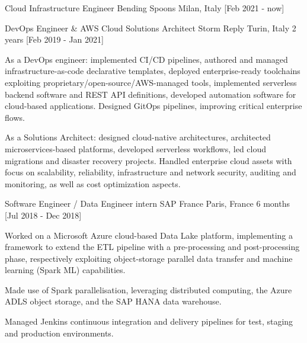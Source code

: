 

\begin{cventries}


  \cventry
    {Cloud Infrastructure Engineer} %
    {Bending Spoons} %
    {Milan, Italy} %
    {[Feb 2021 - now]} %
    {
        \begin{cvitems} %
\item 
        \end{cvitems}
    }

  \cventry
    {DevOps Engineer \& AWS Cloud Solutions Architect} %
    {Storm Reply} %
    {Turin, Italy} %
    {2 years [Feb 2019 - Jan 2021]} %
    {
        \begin{cvitems} %
\item As a DevOps engineer: implemented CI/CD pipelines, authored and managed infrastructure-as-code declarative templates, deployed enterprise-ready toolchains exploiting proprietary/open-source/AWS-managed tools, implemented serverless backend software and REST API definitions, developed automation software for cloud-based applications. Designed GitOps pipelines, improving critical enterprise flows.
\item As a Solutions Architect: designed cloud-native architectures, architected microservices-based platforms, developed serverless workflows, led cloud migrations and disaster recovery projects. Handled enterprise cloud assets with focus on scalability, reliability, infrastructure and network security, auditing and monitoring, as well as cost optimization aspects.
        \end{cvitems}
    }

  \cventry
    {Software Engineer / Data Engineer intern} %
    {SAP France} %
    {Paris, France} %
    {6 months [Jul 2018 - Dec 2018]} %
    {
      \begin{cvitems} %
\item Worked on a Microsoft Azure cloud-based Data Lake platform, implementing a framework to extend the ETL pipeline with a pre-processing and post-processing phase, respectively exploiting object-storage parallel data transfer and machine learning (Spark ML) capabilities.
\item Made use of Spark parallelisation, leveraging distributed computing, the Azure ADLS object storage, and the SAP HANA data warehouse.
\item Managed Jenkins continuous integration and delivery pipelines for test, staging and production environments.
      \end{cvitems}
    }
\end{cventries}

